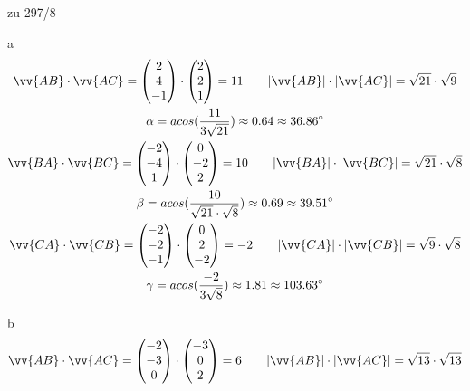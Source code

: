 \newpage
\begin{exercise}{zu 297/8}
  \item [a]
  \begin{gather*}
    \vv{AB} \cdot \vv{AC} = \begin{pmatrix}2 \\ 4 \\ -1\end{pmatrix} \cdot \begin{pmatrix}2 \\ 2 \\ 1\end{pmatrix} = 11 \qquad |\vv{AB}| \cdot |\vv{AC}| = \sqrt{21} \cdot \sqrt{9} \\
    \alpha = acos(\frac{11}{3\sqrt{21}}) \approx 0.64 \approx 36.86^\circ \\
    \vv{BA} \cdot \vv{BC} = \begin{pmatrix}-2 \\ -4 \\ 1\end{pmatrix} \cdot \begin{pmatrix}0 \\ -2 \\ 2\end{pmatrix} = 10 \qquad |\vv{BA}| \cdot |\vv{BC}| = \sqrt{21} \cdot \sqrt{8} \\
    \beta = acos(\frac{10}{\sqrt{21} \cdot \sqrt{8}}) \approx 0.69 \approx 39.51^\circ \\
    \vv{CA} \cdot \vv{CB} = \begin{pmatrix}-2 \\ -2 \\ -1\end{pmatrix} \cdot \begin{pmatrix}0 \\ 2 \\ -2\end{pmatrix} = -2 \qquad |\vv{CA}| \cdot |\vv{CB}| = \sqrt{9} \cdot \sqrt{8} \\
    \gamma = acos(\frac{-2}{3\sqrt{8}}) \approx 1.81 \approx 103.63^\circ
  \end{gather*}
  \item [b]
  \begin{gather*}
    \vv{AB} \cdot \vv{AC} = \begin{pmatrix}-2 \\ -3 \\ 0\end{pmatrix} \cdot \begin{pmatrix}-3 \\ 0 \\ 2\end{pmatrix} = 6 \qquad |\vv{AB}| \cdot |\vv{AC}| = \sqrt{13} \cdot \sqrt{13} \\

\end{gather*}
\end{exercise}
